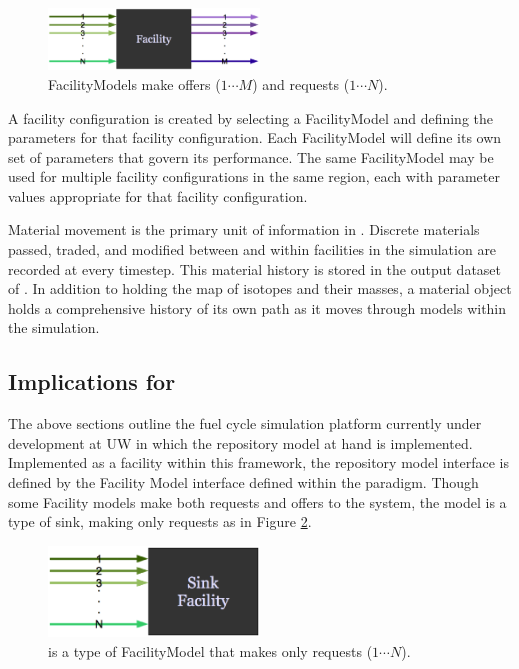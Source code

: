 \begin{figure}[htb!]
  \begin{center}
    \includegraphics[width=0.5\textwidth]{./chapters/paradigm/facility.eps}
  \end{center}
  \caption[\Cyclus FacilityModel offer and request interface.]{\Cyclus FacilityModels make offers ($1\cdots M$) and requests ($1\cdots N$).}
  \label{fig:facility}
\end{figure}


A facility configuration is created by selecting a FacilityModel and 
defining the parameters for that facility configuration.
Each FacilityModel will define its own set of parameters that 
govern its performance.  The same FacilityModel may be used for 
multiple facility configurations in the same region, each with 
parameter values appropriate for that facility configuration.



Material movement is the primary unit of information in \Cyclus.  
Discrete materials passed, traded, and modified between and within facilities 
in the simulation are recorded at every timestep.  This material 
history is stored in the output dataset of \Cyclus. In addition to 
holding the map of isotopes and their masses, a material object holds 
a comprehensive history of its own path as it moves through models 
within the simulation. 

\subsection{Implications for \Cyder}

The above sections outline the fuel cycle simulation platform
currently under development at \gls{UW} in which the \Cyder repository model
at hand is implemented.  Implemented as a facility within this 
framework, the repository model interface is defined by the Facility
Model interface defined within the \Cyclus paradigm. Though some Facility 
models make both requests and offers to the system, the \Cyder model is a type 
of sink, making only requests as in Figure \ref{fig:sinkfacility}.

\begin{figure}[htb!]
  \begin{center}
    \includegraphics[width=0.5\textwidth]{./chapters/paradigm/sinkfacility.eps}
  \end{center}
  \caption[\Cyder request-only interface.]{\Cyder is a type of \Cyclus FacilityModel that makes only requests 
  ($1\cdots N$).}
  \label{fig:sinkfacility}
\end{figure}

